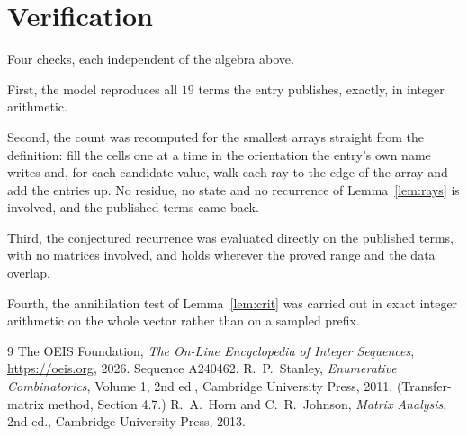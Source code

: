 \documentclass[11pt,a4paper]{article}
\theoremstyle{plain}
\theoremstyle{definition}
\begin{document}
\section{Verification}

Four checks, each independent of the algebra above.

First, the model reproduces all $19$ terms the entry publishes, exactly, in integer
arithmetic.

Second, the count was recomputed for the smallest arrays straight from the definition: fill the
cells one at a time in the orientation the entry's own name writes and, for each candidate
value, walk each ray to the edge of the array and add the entries up. No residue, no state and
no recurrence of Lemma~\ref{lem:rays} is involved, and the published terms came back.

Third, the conjectured recurrence was evaluated directly on the published terms, with no
matrices involved, and holds wherever the proved range and the data overlap.

Fourth, the annihilation test of Lemma~\ref{lem:crit} was carried out in exact integer
arithmetic on the whole vector rather than on a sampled prefix.

\begin{thebibliography}{9}
 The OEIS Foundation, \emph{The On-Line Encyclopedia of Integer
Sequences}, \url{https://oeis.org}, 2026. Sequence A240462.
 R.~P.~Stanley, \emph{Enumerative Combinatorics}, Volume 1, 2nd ed.,
Cambridge University Press, 2011. (Transfer-matrix method, Section 4.7.)
 R.~A.~Horn and C.~R.~Johnson, \emph{Matrix Analysis}, 2nd ed., Cambridge
University Press, 2013.
\end{thebibliography}
\end{document}
